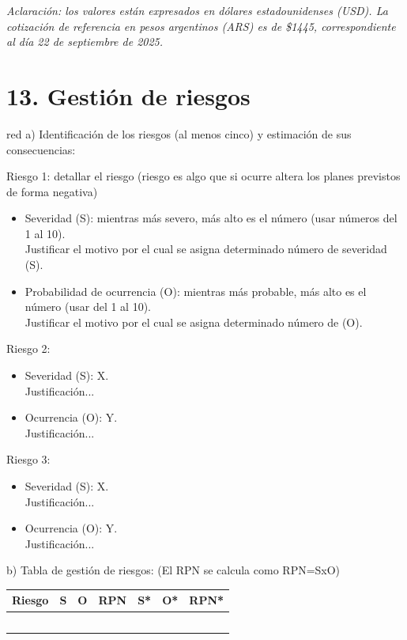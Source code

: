 \documentclass[
11pt, %
codirector, %
]{charter}
\begin{document}
\textit{Aclaración: los valores están expresados en dólares estadounidenses (USD). La cotización de referencia en pesos argentinos (ARS) es de \$1445, correspondiente al día 22 de septiembre de 2025.}

\section{13. Gestión de riesgos}
\label{sec:riesgos}

\begin{consigna}{red}
a) Identificación de los riesgos (al menos cinco) y estimación de sus consecuencias:
 
Riesgo 1: detallar el riesgo (riesgo es algo que si ocurre altera los planes previstos de forma negativa)
\begin{itemize}
	\item Severidad (S): mientras más severo, más alto es el número (usar números del 1 al 10).\\
	Justificar el motivo por el cual se asigna determinado número de severidad (S).
	\item Probabilidad de ocurrencia (O): mientras más probable, más alto es el número (usar del 1 al 10).\\
	Justificar el motivo por el cual se asigna determinado número de (O). 
\end{itemize}   

Riesgo 2:
\begin{itemize}
	\item Severidad (S): X.\\
	Justificación...
	\item Ocurrencia (O): Y.\\
	Justificación...
\end{itemize}

Riesgo 3:
\begin{itemize}
	\item Severidad (S):  X.\\
	Justificación...
	\item Ocurrencia (O): Y.\\
	Justificación...
\end{itemize}


b) Tabla de gestión de riesgos:      (El RPN se calcula como RPN=SxO)

\begin{table}[htpb]
\centering
\begin{tabularx}{\linewidth}{@{}|X|c|c|c|c|c|c|@{}}
\hline
\rowcolor[HTML]{C0C0C0} 
Riesgo & S & O & RPN & S* & O* & RPN* \\ \hline
       &   &   &     &    &    &      \\ \hline
       &   &   &     &    &    &      \\ \hline
       &   &   &     &    &    &      \\ \hline
       &   &   &     &    &    &      \\ \hline
       &   &   &     &    &    &      \\ \hline
\end{tabularx}%
\end{table}


\end{consigna}
\end{document}

